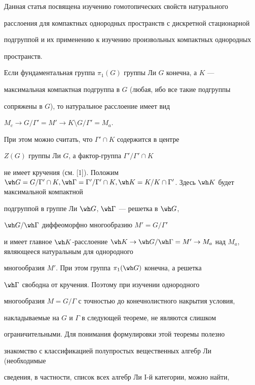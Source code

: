 Данная статья посвящена изучению гомотопических свойств натурального


расслоения для компактных однородных пространств с дискретной стационарной


подгруппой и их применению к изучению произвольных компактных однородных


пространств.





Если фундаментальная группа $\pi_1(G)$ группы Ли $G$ конечна, а $K$ ---


максимальная компактная подгруппа в $G$ (любая, ибо все такие подгруппы


сопряжены в $G$), то натуральное расслоение имеет вид


$M_c \to G/ \Gamma' =M' \to K\setminus G/\Gamma' =M_a$.


При этом можно считать, что $\Gamma' \cap K$ содержится в центре


$Z(G)$ группы Ли $G$, а фактор-группа $\Gamma' / \Gamma' \cap K$


не имеет кручения (см. [1]). Положим $\wh G = G/\Gamma'


\cap K,\wh \Gamma =\Gamma' /\Gamma' \cap K,


\wh K =K/K \cap \Gamma'$. Здесь $\wh K$ будет максимальной компактной


подгруппой в группе Ли $\wh G$, $\wh \Gamma$ --- решетка в $\wh G$,


$\wh G / \wh \Gamma$ диффеоморфно многообразию $M' =G/\Gamma'$


и имеет главное $\wh K$-расслоение $\wh K \to \wh G/ \wh \Gamma =


M' \to M_a$ над $M_a$, являющееся натуральным для однородного


многообразия $M'$. При этом группа $\pi_1(\wh G)$ конечна, а решетка


$\wh \Gamma$ свободна от кручения. Поэтому при изучении однородного


многообразия $M=G/\Gamma$ с точностью до конечнолистного накрытия условия,


накладываемые на $G$ и $\Gamma$ в следующей теореме, не являются слишком


ограничительными. Для понимания формулировки этой теоремы полезно


знакомство с классификацией полупростых вещественных алгебр Ли (необходимые


сведения, в частности, список всех алгебр Ли I-й категории, можно найти,


